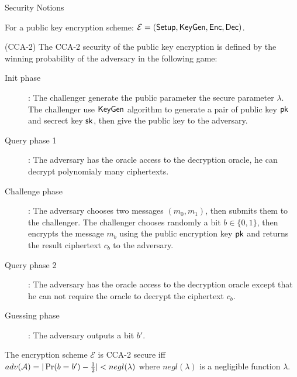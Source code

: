 \begin{subsection}{Security Notions}

  For a public key encryption scheme: $\mathcal{E} = ({\mathsf{Setup}}, {\mathsf{KeyGen}}, {\mathsf{Enc}}, {\mathsf{Dec}})$.

  \begin{myDef}{(CCA-2)}
  The CCA-2 security of the public key encryption is defined by the winning probability of the adversary in the following game:
  \begin{description}
  \item[Init phase]:
    The challenger generate the public parameter \wrt the secure parameter $\lambda$. The challenger use ${\mathsf{KeyGen}}$ algorithm to generate a pair of public key $\mathsf{pk}$ and secrect key $\mathsf{sk}$, then give the public key to the adversary.
  \item[Query phase 1]: The adversary has the oracle access to the decryption oracle, he can decrypt polynomialy many ciphertexts.
  \item[Challenge phase]: The adversary chooses two messages $(m_0, m_1)$, then submits them to the challenger. The challenger chooses randomly a bit $b \in \{0,1\}$, then encrypts the message $m_b$ using the public encryption key $\mathsf{pk}$ and returns the result ciphertext $c_b$ to the adversary.
  \item[Query phase 2]: The adversary has the oracle access to the decryption oracle except that he can not require the oracle to decrypt the ciphertext $c_b$.
  \item[Guessing phase]: The adversary outputs a bit $b'$.
  \end{description}

  The encryption scheme $\mathcal{E}$ is CCA-2 secure iff $adv(\mathcal{A}) = |\operatorname{Pr}(b = b') - \frac{1}{2}| < negl(\lambda)$ where $negl(\lambda)$ is a negligible function \wrt $\lambda$.
  \end{myDef}


\end{subsection}
